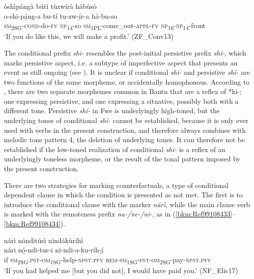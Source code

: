 \ea
\label{bkm:Ref99108176}
òshìpángà bútì tùzwírà hábùsò\\
\gll o-shi-pá̲ng-a    bu-tí    tu-zw-í̲r-a      há-bu-so\\
\textsc{sm}\textsubscript{2SG}-\textsc{cond}-do-\textsc{fv}  \textsc{np}\textsubscript{14}-so  \textsc{sm}\textsubscript{1PL}-come\_out-\textsc{appl}-\textsc{fv}  \textsc{np}\textsubscript{16}-\textsc{np}\textsubscript{14}-front\\
\glt ‘If you do like this, we will make a profit.’ (ZF\_Conv13)
\z

\hspace*{-6pt}The conditional prefix \textit{shi-} resembles the post-initial persistive prefix \textit{shí-}, which marks persistive aspect, i.e. a subtype of imperfective aspect that presents an event as still ongoing (see ). It is unclear if conditional \textit{shi-} and persistive \textit{shí-} are two functions of the same morpheme, or accidentally homophonous. According to \citet[148]{Nurse2008}, there are two separate morphemes common in Bantu that are a reflex of *ki-; one expressing persistive, and one expressing a situative, possibly both with a different tone. Persistive \textit{shí-} in Fwe is underlyingly high-toned, but the underlying tones of conditional \textit{shi-} cannot be established, because it is only ever used with verbs in the present construction, and therefore always combines with melodic tone pattern 4, the deletion of underlying tones. It can therefore not be established if the low-toned realization of conditional \textit{shi-} is a reflex of an underlyingly toneless morpheme, or the result of the tonal pattern imposed by the present construction.

There are two strategies for marking counterfactuals, a type of conditional dependent clause in which the condition is presented as not met. The first is to introduce the conditional clause with the marker \textit{nárì}, while the main clause verb is marked with the remoteness prefix \textit{na-/ne-/ni-}, as in (\ref{bkm:Ref99108433}--\ref{bkm:Ref99108434}).

\ea
\label{bkm:Ref99108433}
nárì nóndìtúsì nìndàkùríhì\\
\gll nári  nó̲-ndi-tus-i        ni-ndi-a-ku-rih-í̲\\
if  \textsc{sm}\textsubscript{2SG}.\textsc{pst}-\textsc{om}\textsubscript{1SG}-help-\textsc{npst}.\textsc{pfv}  \textsc{rem}-\textsc{sm}\textsubscript{1SG}-\textsc{pst}-\textsc{om}\textsubscript{2SG}-pay-\textsc{npst}.\textsc{pfv}\\
\glt ‘If you had helped me [but you did not], I would have paid you.’ (NF\_Elic17)
\z


